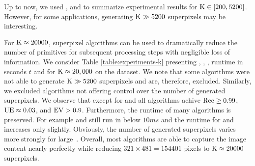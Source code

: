 Up to now, we used \ARec, \AUE and \AEV to summarize experimental results for $\text{K} \in [200,5200]$.
However, for some applications, generating $\text{K} \gg 5200$ superpixels may be interesting.

For $\text{K} \approx 20000$, superpixel algorithms can be used to dramatically reduce the
number of primitives for subsequent processing steps with negligible loss of information.
We consider Table \ref{table:experiments-k}
presenting \Rec, \UE, \EV, runtime in seconds $t$ and \K for $\text{K} \approx 20,000$ on
the \BSDS dataset. We note that some algorithms were not able to generate $\text{K} \gg 5200$
superpixels and are, therefore, excluded. Similarly, we excluded algorithms not offering
control over the number of generated superpixels. We observe that except for \VC and \PF all
algorithms achive $\text{Rec} \geq 0.99$, $\text{UE} \approx 0.03$, and $\text{EV} > 0.9$. Furthermore, the runtime of
many algorithms is preserved. For example \W and \CW still run in below $10ms$ and the
runtime for \preSLIC and \SLIC increases only slightly. Obviously, the number of
generated superpixels varies more strongly for large~\K. Overall, most algorithms
are able to capture the image content nearly perfectly while reducing
 $321 \times 481 = 154401$ pixels to $\text{K} \approx 20000$ superpixels.
